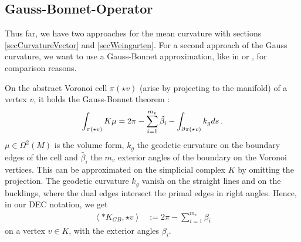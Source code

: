   \subsection{Gauss-Bonnet-Operator}
    Thus far, we have two approaches for the mean curvature with sections \ref{secCurvatureVector} and \ref{secWeingarten}.
    For a second approach of the Gauss curvature, we want to use a Gauss-Bonnet approximation, like in \cite{polthier} or \cite{octavian}, for comparison reasons.
    
    On the abstract Voronoi cell \( \pi(\star v) \) (arise by projecting to the manifold) of a vertex \( v \), 
    it holds the Gauss-Bonnet theorem \cite{berger}:
    \begin{align}
      \label{eqGaussBonnet}
      \int_{\pi(\star v)}K \mu = 2\pi - \sum_{i=1}^{m_{v}}\tilde{\beta_{i}} - \int_{\partial\pi(\star v)} k_{g} ds \,\text{.}
    \end{align}
    \( \mu\in\Omega^{2}(M)  \) is the volume form, \( k_{g} \) the geodetic curvature on the boundary edges of the cell 
    and \( \tilde{\beta_{i}} \) the \( m_{v} \) exterior angles of the boundary on the Voronoi vertices.
    This can be approximated on the simplicial complex \( K \) by omitting the projection.
    The geodetic curvature \( k_{g} \) vanish on the straight lines and on the bucklings, where the dual edges intersect the primal edges
    in right angles.
    Hence, in our DEC notation, we get
    \begin{align}
      \label{eqDisGaussBonnet}
      \left\langle *K_{GB} , \star v \right\rangle &:= 2\pi - \sum_{i=1}^{m_{v}}\beta_{i}
    \end{align}
    on a vertex \( v\in K \), with the exterior angles \( \beta_{i} \).
